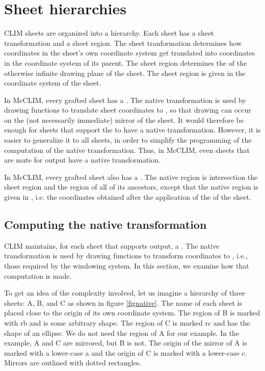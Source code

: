 \chapter{Sheet hierarchies}

CLIM sheets are organized into a hierarchy.  Each sheet has a sheet
transformation and a sheet region.  The sheet tranformation determines
how coordinates in the sheet's own coordinate system get translated
into coordinates in the coordinate system of its parent.  The sheet
region determines the  of the
otherwise infinite drawing plane of the sheet.  The sheet region is
given in the coordinate system of the sheet. 

In McCLIM, every grafted sheet has a .
The native transformation is used by drawing functions to translate
sheet coordinates to , so that drawing can
occur on the (not necessarily immediate) mirror of the sheet.  It
would therefore be enough for sheets that support the  to have a native transformation.  However, it is easier to
generalize it to all sheets, in order to simplify the programming of
the computation of the native transformation.  Thus, in McCLIM, even
sheets that are mute for output have a native transformation.

In McCLIM, every grafted sheet also has a .  The
native region is intersection the sheet region and the region of all
of its ancestors, except that the native region is given in
, i.e. the coordinates obtained after the
application of the  of the sheet.

\section{Computing the native transformation}

CLIM maintains, for each sheet that supports output, a .  The native transformation is used by drawing
functions to transform coordinates to ,
i.e., those required by the windowing system.  In this section, we
examine how that computation is made.

To get an idea of the complexity involved, let us imagine a hierarchy
of three sheets: A, B, and C as shown in figure \ref{fignative}.  The
name of each sheet is placed close to the origin of its own coordinate
system.  The region of B is marked with rb and is some arbitrary
shape.  The region of C is marked rc and has the shape of an ellipse.
We do not need the region of A for our example.  In the example, A and
C are mirrored, but B is not.  The origin of the mirror of A is marked
with a lower-case a and the origin of C is marked with a lower-case
c.  Mirrors are outlined with dotted rectangles. 

